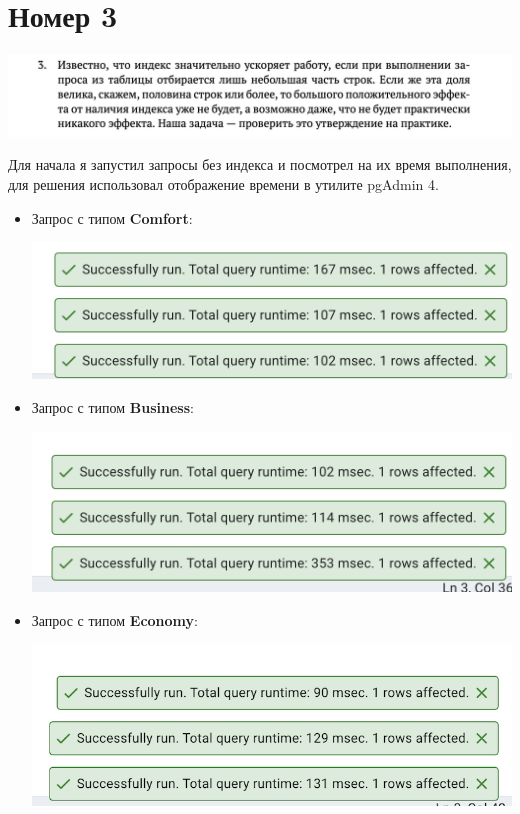 \documentclass[a4paper,12pt]{article}
\begin{document}
\section*{Номер 3}
\begin{center}
\includegraphics[scale=0.8]{t2.png}
\end{center}
Для начала я запустил запросы без индекса и посмотрел на их время выполнения, для решения использовал отображение времени в утилите pgAdmin 4.
\begin{itemize}
\item Запрос с типом \textbf{Comfort}:
\begin{center}
\includegraphics[scale=0.4]{21.png}
\end{center}
\item Запрос с типом \textbf{Business}:
\begin{center}
\includegraphics[scale=0.4]{22.png}
\end{center}
\item Запрос с типом \textbf{Economy}:
\begin{center}
\includegraphics[scale=0.4]{23.png}
\end{center}
\end{itemize}
\end{document}
